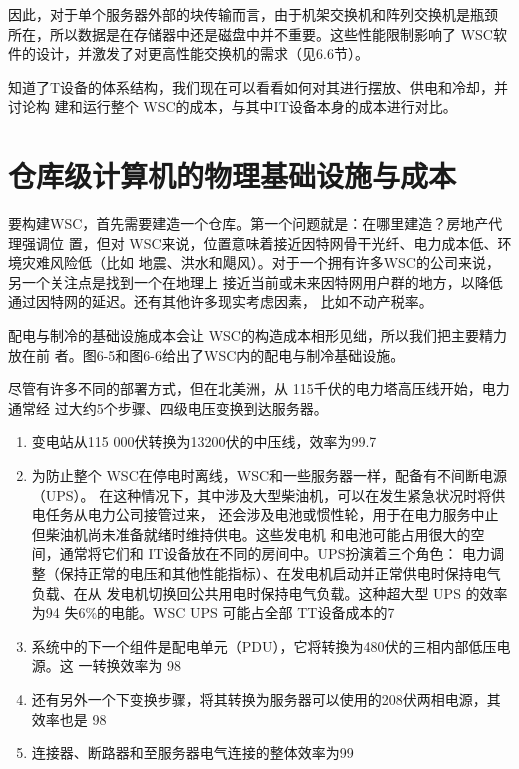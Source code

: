 因此，对于单个服务器外部的块传输而言，由于机架交换机和阵列交换机是瓶颈
所在，所以数据是在存储器中还是磁盘中并不重要。这些性能限制影响了 WSC软
件的设计，并激发了对更高性能交换机的需求（见6.6节）。

知道了T设备的体系结构，我们现在可以看看如何对其进行摆放、供电和冷却，并讨论构
建和运行整个 WSC的成本，与其中IT设备本身的成本进行对比。

\section{仓库级计算机的物理基础设施与成本}
要构建WSC，首先需要建造一个仓库。第一个问题就是：在哪里建造？房地产代理强调位
置，但对 WSC来说，位置意味着接近因特网骨干光纤、电力成本低、环境灾难风险低（比如
地震、洪水和飓风）。对于一个拥有许多WSC的公司来说，另一个关注点是找到一个在地理上
接近当前或未来因特网用户群的地方，以降低通过因特网的延迟。还有其他许多现实考虑因素，
比如不动产税率。

配电与制冷的基础设施成本会让 WSC的构造成本相形见绌，所以我们把主要精力放在前
者。图6-5和图6-6给出了WSC内的配电与制冷基础设施。

尽管有许多不同的部署方式，但在北美洲，从 115千伏的电力塔高压线开始，电力通常经
过大约5个步骤、四级电压变换到达服务器。
\begin{enumerate}
    \item 变电站从115 000伏转换为13200伏的中压线，效率为99.7%
    \item 为防止整个 WSC在停电时离线，WSC和一些服务器一样，配备有不间断电源（UPS）。
    在这种情况下，其中涉及大型柴油机，可以在发生紧急状况时将供电任务从电力公司接管过来，
    还会涉及电池或惯性轮，用于在电力服务中止但柴油机尚未准备就绪时维持供电。这些发电机
    和电池可能占用很大的空间，通常将它们和 IT设备放在不同的房间中。UPS扮演着三个角色：
    电力调整（保持正常的电压和其他性能指标）、在发电机启动并正常供电时保持电气负载、在从
    发电机切换回公共用电时保持电气负载。这种超大型 UPS 的效率为94%
    失6\%的电能。WSC UPS 可能占全部 TT设备成本的7%
    \item 系统中的下一个组件是配电单元（PDU），它将转換为480伏的三相内部低压电源。这
    一转换效率为 98%
    \item 还有另外一个下变换步骤，将其转换为服务器可以使用的208伏两相电源，其效率也是
    98%
    \item 连接器、断路器和至服务器电气连接的整体效率为99%
\end{enumerate}

